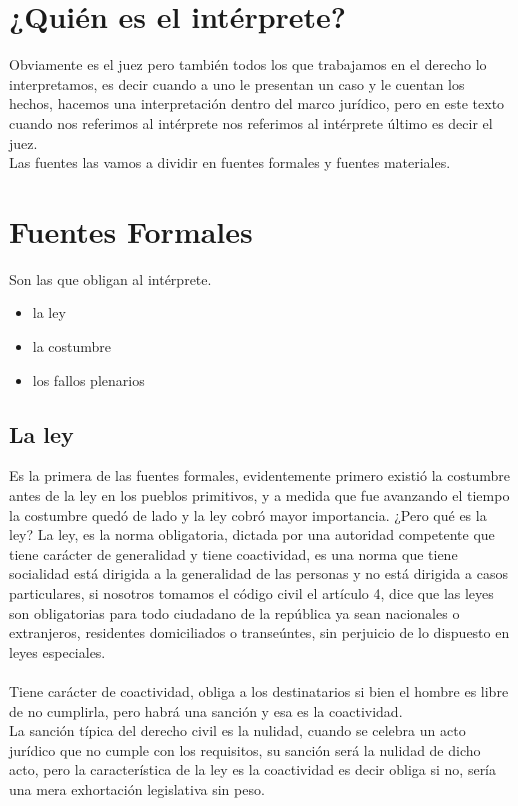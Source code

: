 \documentclass[12pt]{book}
\begin{document}
\section{¿Quién es el intérprete?}
Obviamente es el juez pero también todos los que trabajamos en el derecho lo interpretamos, es decir cuando a uno le presentan un caso y le cuentan los hechos, hacemos una interpretación dentro del marco jurídico, pero en este texto cuando nos referimos al intérprete nos referimos al intérprete último es decir el juez.
\\
Las fuentes las vamos a dividir en fuentes formales y fuentes materiales.
\section{Fuentes Formales}Son las que obligan al intérprete.   
\begin{itemize}
\item la ley
\item la costumbre
\item los fallos plenarios
\end{itemize}
\subsection{La ley}
Es la primera de las fuentes formales, evidentemente primero existió la costumbre antes de la ley en los pueblos primitivos, y a medida que fue avanzando el tiempo la costumbre quedó de lado y la ley cobró mayor importancia.
¿Pero qué es la ley? La ley, es la norma obligatoria, dictada por una autoridad competente que tiene carácter de generalidad y tiene coactividad, es una norma que tiene socialidad está dirigida a la generalidad de las personas y no está dirigida a casos particulares, si nosotros tomamos el código civil el artículo 4, dice que las leyes son obligatorias para todo ciudadano de la república ya sean nacionales o extranjeros, residentes domiciliados o transeúntes, sin perjuicio de lo dispuesto en leyes especiales.
\\
\\
Tiene carácter de coactividad, obliga a los destinatarios si bien el hombre es libre de no cumplirla, pero habrá una sanción y esa es la coactividad.\\
La sanción típica del derecho civil es la nulidad, cuando se celebra un acto jurídico que no cumple con los requisitos, su sanción será la nulidad de dicho acto, pero la característica de la ley es la coactividad es decir obliga si no, sería una mera exhortación legislativa sin peso.
\end{document}
